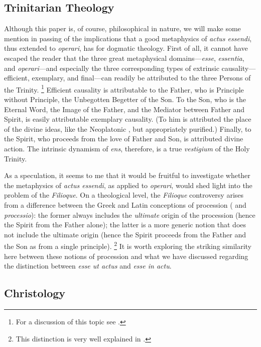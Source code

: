 \subsection{Trinitarian Theology}

Although this paper is, of course, philosophical in nature, we will make some mention in passing of the implications that a good metaphysics of \emph{actus essendi}, thus extended to \emph{operari}, has for dogmatic theology. First of all, it cannot have escaped the reader that the three great metaphysical domains---\emph{esse}, \emph{essentia}, and \emph{operari}---and especially the three corresponding types of extrinsic causality---efficient, exemplary, and final---can readily be attributed to the three Persons of the Trinity.%
%
\footnote{For a discussion of this topic see \cite[23--31]{contat:esse-essentia-ordo}.}
%
Efficient causality is attributable to the Father, who is Principle without Principle, the Unbegotten Begetter of the Son. To the Son, who is the Eternal Word, the Image of the Father, and the Mediator between Father and Spirit, is easily attributable exemplary causality. (To him is attributed the place of the divine ideas, like the Neoplatonic , but appropriately purified.) Finally, to the Spirit, who proceeds from the love of Father and Son, is attributed divine action. The intrinsic dynamism of \emph{ens}, therefore, is a true \emph{vestigium} of the Holy Trinity.

As a speculation, it seems to me that it would be fruitful to investigate whether the metaphysics of \emph{actus essendi}, as applied to \emph{operari}, would shed light into the problem of the \emph{Filioque}. On a theological level, the \emph{Filioque} controversy arises from a difference between the Greek and Latin conceptions of procession ( and \emph{processio}): the former always includes the \emph{ultimate} origin of the procession (hence the Spirit  from the Father alone); the latter is a more generic notion that does not include the ultimate origin (hence the Spirit proceeds from the Father and the Son as from a single principle).%
%
\footnote{This distinction is very well explained in \cite{doc:processionhs}.}
%
It is worth exploring the striking similarity here between these notions of procession and what we have discussed regarding the distinction between \emph{esse ut actus} and \emph{esse in actu}.

\subsection{Christology}

